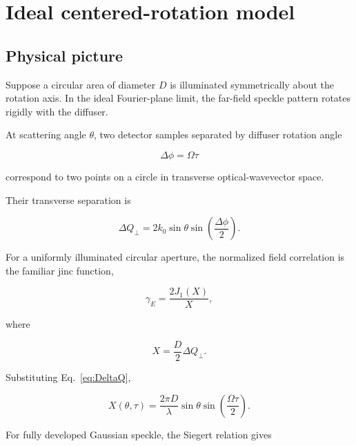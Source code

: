 \documentclass[11pt]{article}
\newcommand{\kopt}{k_0}
\begin{document}
\section{Ideal centered-rotation model}

\subsection{Physical picture}

Suppose a circular area of diameter $D$ is illuminated symmetrically about the
rotation axis. In the ideal Fourier-plane limit, the far-field speckle pattern
rotates rigidly with the diffuser.

At scattering angle $\theta$, two detector samples separated by diffuser
rotation angle

\begin{equation}
    \Delta\phi=\Omega\tau
\end{equation}

correspond to two points on a circle in transverse optical-wavevector space.

Their transverse separation is

\begin{equation}
    \Delta Q_\perp
    =
    2\kopt\sin\theta
    \sin\left(\frac{\Delta\phi}{2}\right).
    \label{eq:DeltaQ}
\end{equation}

For a uniformly illuminated circular aperture, the normalized field
correlation is the familiar jinc function,

\begin{equation}
    \gamma_E
    =
    \frac{2J_1(X)}{X},
\end{equation}

where

\begin{equation}
    X
    =
    \frac{D}{2}\Delta Q_\perp.
\end{equation}

Substituting Eq.~\eqref{eq:DeltaQ},

\begin{equation}
    \boxed{
    X(\theta,\tau)
    =
    \frac{2\pi D}{\lambda}
    \sin\theta
    \sin\left(\frac{\Omega\tau}{2}\right)
    }.
    \label{eq:Xexact}
\end{equation}

For fully developed Gaussian speckle, the Siegert relation gives
\end{document}
